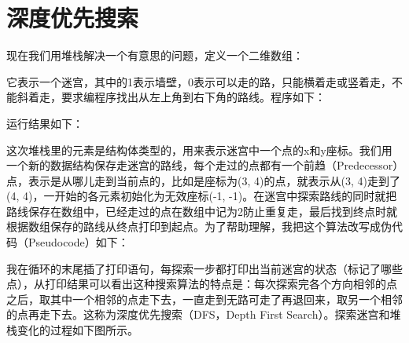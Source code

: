 


\section{深度优先搜索}
%
现在我们用堆栈解决一个有意思的问题，定义一个二维数组：




它表示一个迷宫，其中的1表示墙壁，0表示可以走的路，只能横着走或竖着走，不能斜着走，要求编程序找出从左上角到右下角的路线。程序如下：





运行结果如下：




这次堆栈里的元素是结构体类型的，用来表示迷宫中一个点的x和y座标。我们用一个新的数据结构保存走迷宫的路线，每个走过的点都有一个前趋（Predecessor）点，表示是从哪儿走到当前点的，比如是座标为(3, 4)的点，就表示从(3, 4)走到了(4, 4)，一开始的各元素初始化为无效座标(-1, -1)。在迷宫中探索路线的同时就把路线保存在数组中，已经走过的点在数组中记为2防止重复走，最后找到终点时就根据数组保存的路线从终点打印到起点。为了帮助理解，我把这个算法改写成伪代码（Pseudocode）如下：




我在循环的末尾插了打印语句，每探索一步都打印出当前迷宫的状态（标记了哪些点），从打印结果可以看出这种搜索算法的特点是：每次探索完各个方向相邻的点之后，取其中一个相邻的点走下去，一直走到无路可走了再退回来，取另一个相邻的点再走下去。这称为深度优先搜索（DFS，Depth First Search）。探索迷宫和堆栈变化的过程如下图所示。




